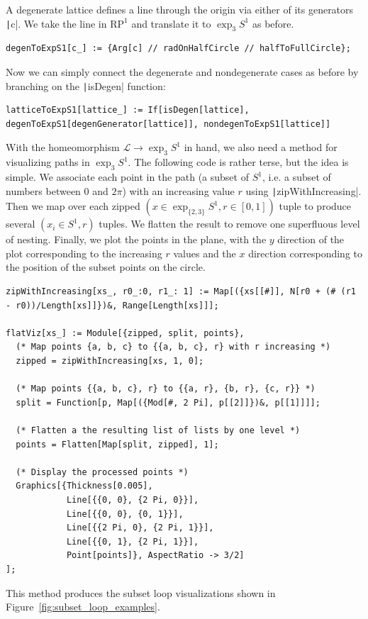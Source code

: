 \documentclass[12pt,twoside]{reedthesis}
\theoremstyle{definition}
\newcommand{\LS}{\mathcal{L}}
\newcommand{\exptwothree}{\exp_{\{2,3\}}}
\newcommand{\mathe}[1]{\texttt|#1|}
\begin{document}
A degenerate lattice defines a line through the origin via either of its generators \texttt|c|.
We take the line in $\mathrm{RP}^1$ and translate it to $\exp_3 S^1$ as before.
\begin{verbatim}
degenToExpS1[c_] := {Arg[c] // radOnHalfCircle // halfToFullCircle};
\end{verbatim}
Now we can simply connect the degenerate and nondegenerate cases as before by branching on the \texttt|isDegen| function:
\begin{verbatim}
latticeToExpS1[lattice_] := If[isDegen[lattice], degenToExpS1[degenGenerator[lattice]], nondegenToExpS1[lattice]]
\end{verbatim}
With the homeomorphism $\LS \to \exp_3 S^1$ in hand, we also need a method for visualizing paths in $\exp_3 S^1$.
The following code is rather terse, but the idea is simple.
We associate each point in the path (a subset of $S^1$, i.e. a subset of numbers between 0 and $2\pi$) with an increasing value $r$ using \mathe{zipWithIncreasing}.
Then we map over each zipped $(x \in \exptwothree S^1, r \in [0,1])$ tuple to produce several $(x_i \in S^1, r)$ tuples.
We flatten the result to remove one superfluous level of nesting.
Finally, we plot the points in the plane, with the $y$ direction of the plot corresponding to the increasing $r$ values and the $x$ direction corresponding to the position of the subset points on the circle.
\begin{verbatim}
zipWithIncreasing[xs_, r0_:0, r1_: 1] := Map[({xs[[#]], N[r0 + (# (r1 - r0))/Length[xs]]})&, Range[Length[xs]]];

flatViz[xs_] := Module[{zipped, split, points},
  (* Map points {a, b, c} to {{a, b, c}, r} with r increasing *)
  zipped = zipWithIncreasing[xs, 1, 0];

  (* Map points {{a, b, c}, r} to {{a, r}, {b, r}, {c, r}} *)
  split = Function[p, Map[({Mod[#, 2 Pi], p[[2]]})&, p[[1]]]];

  (* Flatten a the resulting list of lists by one level *)
  points = Flatten[Map[split, zipped], 1];

  (* Display the processed points *)
  Graphics[{Thickness[0.005],
            Line[{{0, 0}, {2 Pi, 0}}],
            Line[{{0, 0}, {0, 1}}],
            Line[{{2 Pi, 0}, {2 Pi, 1}}],
            Line[{{0, 1}, {2 Pi, 1}}],
            Point[points]}, AspectRatio -> 3/2]
];
\end{verbatim}
This method produces the subset loop visualizations shown in Figure~\ref{fig:subset_loop_examples}.
\end{document}
